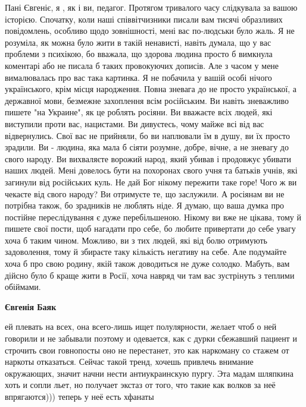 \begin{itemize}
Пані Євгеніє, я , як і ви, педагог. Протягом тривалого часу слідкувала за вашою
історією. Спочатку, коли наші співвітчизники писали вам тисячі образливих
повідомлень, особливо щодо зовнішності, мені вас по-людськи було жаль. Я не
розуміла, як можна було жити в такій ненависті, навіть думала, що у вас
проблеми з психікою, бо вважала, що здорова людина просто б вимкнула коментарі
або не писала б таких провокуючих дописів. Але з часом у мене вималювалась про
вас така картинка. Я не побачила у вашій особі нічого українського, крім місця
народження. Повна зневага до не просто української, а державної мови, безмежне
захоплення всім російським. Ви навіть зневажливо пишете "на Украине", як це
роблять росіяни. Ви вважаєте всіх людей, які виступили проти вас, нацистами. Ви
дивуєтесь, чому майже всі від вас відвернулись. Свої вас не прийняли, бо ви
наплювали їм в душу, ви їх просто зрадили. Ви - людина, яка мала б сіяти
розумне, добре, вічне, а не зневагу до свого народу. Ви вихваляєте ворожий
народ, який убивав і продовжує убивати наших людей. Мені довелось бути на
похоронах свого учня та батьків учнів, які загинули від російських куль. Не дай
Бог нікому пережити таке горе! Чого ж ви чекаєте від свого народу? Ви отримуєте
те, що заслужили. А росіянам ви не потрібна також, бо зрадників не люблять
ніде. Я думаю, що ваша думка про постійне переслідування є дуже перебільшеною.
Нікому ви вже не цікава, тому й пишете свої пости, щоб нагадати про себе, бо
любите привертати до себе увагу хоча б таким чином. Можливо, ви з тих людей,
які від болю отримують задоволення, тому й збираєте таку кількість негативу на
себе. Але подумайте хоча б про свою родину, якій також доводиться не дуже
солодко. Мабуть, вам дійсно було б краще жити в Росії, хоча навряд чи там вас
зустрінуть з теплими обіймами.

\begin{itemize}
 
\textbf{Євгенія Баяк} 

ей плевать на всех, она всего-лишь ищет полулярности, желает чтоб о ней
говорили и не забывали поэтому и одевается, как с дурки сбежавший пациент и
строчить свои говнопосты оно не перестанет, это как наркоману со стажем от
наркоты отказаться. Сейчас такой тренд, хочешь привлечь внимание окружающих,
значит начни нести антиукраинскую пургу. Эта мадам шляпкина хоть и сопли льет,
но получает экстаз от того, что такие как волков за неё впрягаются))) теперь у
неё есть хфанаты 🥴😂



\end{itemize}
\end{itemize}
